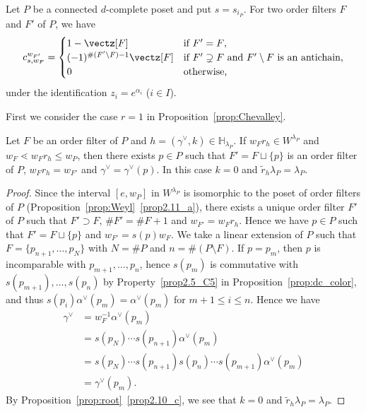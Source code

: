 \begin{prop}
\label{prop:Chevalley_P}
Let $P$ be a connected $d$-complete poset and put $s = s_{i_P}$.
For two order filters $F$ and $F'$ of $P$, we have
\begin{equation}
\label{eq:Chevalley_P}
c^{w_{F'}}_{s,w_F}
 =
\begin{cases}
 1 - \vectz[F]
 &\text{if $F' = F$,}
\\
 (-1)^{\# (F' \setminus F) -1} \vectz[F]
 &\text{if $F' \supsetneq F$ and $F' \setminus F$ is an antichain,}
\\
 0
 &\text{otherwise,}
\end{cases}
\end{equation}
under the identification $z_i = e^{\alpha_i}$ \textup{(}$i \in I$\textup{)}.
\end{prop}

First we consider the case $r=1$ in Proposition~\ref{prop:Chevalley}.

\begin{lemm}
\label{lem:r=1}
Let $F$ be an order filter of $P$ and $h = (\gamma^\vee,k) \in \mathbb{H}_{\lambda_P}$.
If $w_F r_h \in W^{\lambda_P}$ and $w_F \lessdot w_F r_h \le w_P$, 
then there exists $p \in P$ such that $F' = F \sqcup \{ p \}$ is an order filter of $P$, 
$w_F r_h = w_{F'}$ and $\gamma^\vee = \gamma^\vee(p)$.
In this case $k=0$ and $\tilde{r}_h \lambda_P = \lambda_P$.
\end{lemm}

\begin{proof}
Since the interval $[e, w_P]$ in $W^{\lambda_P}$ is isomorphic to the poset of order filters of $P$ 
(Proposition~\ref{prop:Weyl}~\ref{prop2.11_a}), 
there exists a unique order filter $F'$ of $P$ such that $F' \supset F$, 
$\# F' = \# F + 1$ and $w_{F'} = w_F r_h$.
Hence we have $p \in P$ such that $F' = F \sqcup \{ p \}$ and $w_{F'} = s(p) w_F$.
We take a linear extension of $P$ such that $F = \{ p_{n+1}, \ldots, p_N \}$ 
with $N = \# P$ and $n = \# (P \setminus F)$.
If $p = p_m$, then $p$ is incomparable with $p_{m+1}, \ldots, p_n$, 
hence $s(p_m)$ is commutative with $s(p_{m+1}), \ldots, s(p_n)$ by Property~\ref{prop2.5_C5}
in Proposition~\ref{prop:dc_color}, 
and thus $s(p_i)\alpha^\vee(p_m)=\alpha^\vee(p_m)$ for $m+1 \le i \le n$.
Hence we have
\begin{align*}
\gamma^\vee
 &= 
w_F^{-1} \alpha^\vee(p_m)
\\
 &=
s(p_N) \cdots s(p_{n+1}) \alpha^\vee(p_m)
\\
 &=
s(p_N) \cdots s(p_{n+1}) s(p_n) \cdots s(p_{m+1}) \alpha^\vee(p_m)
\\
 &=
\gamma^\vee(p_m).
\end{align*}
By Proposition~\ref{prop:root}~\ref{prop2.10_c}, we see that $k=0$ and $\tilde{r}_h \lambda_P = \lambda_P$.
\end{proof}

